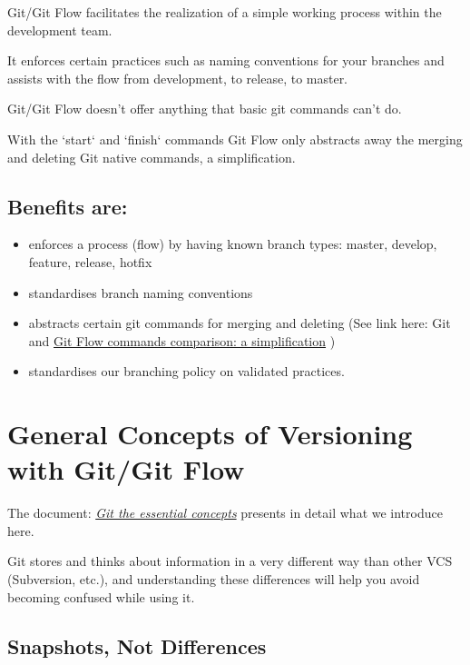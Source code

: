 \documentclass{tufte-handout}
\begin{document}
	Git/Git Flow facilitates the realization of a simple working process within the development team.
	
	It enforces certain practices such as naming conventions for your branches and assists with the flow from development, to release, to master.
	
	Git/Git Flow doesn't offer anything that basic git commands can't do.
	
	With the `start` and `finish` commands Git Flow only abstracts away the merging and deleting Git native commands, a simplification.
	
	\subsection*{Benefits are:}
	\begin{itemize}
		\item enforces a process (flow) by having known branch types: master, develop, feature, release, hotfix
		\item standardises branch naming conventions
		\item abstracts certain git commands for merging and deleting (See link here: Git and \href{https://gist.github.com/JamesMGreene/cdd0ac49f90c987e45ac}{Git Flow commands comparison: a simplification} )
		\item standardises our branching policy on validated practices.
	\end{itemize}

	
	\clearpage
	
	\section{General Concepts of Versioning with Git/Git Flow}
	
	The document: \emph{\href{https://git-scm.com/book/en/v2/Git-Basics-Getting-a-Git-Repository}{Git the essential concepts}} presents in detail what we introduce here.
	
	Git stores and thinks about information in a very different way than other VCS (Subversion, etc.), and understanding these differences will help you avoid becoming confused while using it.
	
	\subsection{Snapshots, Not Differences}
	
\end{document}
